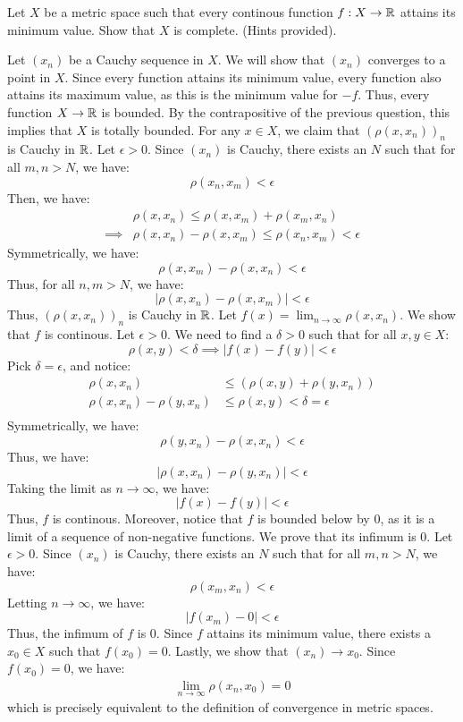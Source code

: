 \documentclass[12pt]{article}
\begin{document}
\newpage

\begin{problab}{7}
    Let $X$ be a metric space such that every continous function $f: X \to \mathbb R$ attains its minimum value. Show that $X$ is complete. (Hints provided).
\end{problab}

\begin{solu}
    Let $(x_n)$ be a Cauchy sequence in $X$. We will show that $(x_n)$ converges to a point in $X$. \bbni
    Since every function attains its minimum value, every function also attains its maximum value, as this is the minimum value for $-f$. Thus, every function $X \to \mathbb R$ is bounded. By the contrapositive of the previous question, this implies that $X$ is totally bounded. \bbni
    For any $x \in X$, we claim that $(\rho(x, x_n))_n$ is Cauchy in $\mathbb R$. Let $\epsilon > 0$. Since $(x_n)$ is Cauchy, there exists an $N$ such that for all $m, n > N$, we have: 
    \[ \rho(x_n, x_m) < \epsilon\]
    Then, we have:
    \begin{align*}
       &\rho(x, x_n) \leq \rho(x, x_m) + \rho(x_m, x_n) \\
       \implies &\rho(x, x_n) - \rho(x, x_m) \leq \rho(x_n, x_m) < \epsilon
    \end{align*}
    Symmetrically, we have:
    \[\rho(x, x_m) - \rho(x, x_n) < \epsilon\]
    Thus, for all $n, m > N$, we have:
    \[|\rho(x, x_n) - \rho(x, x_m)| < \epsilon \]
    Thus, $(\rho(x, x_n))_n$ is Cauchy in $\mathbb R$. \bbni 
    Let $f(x) = \lim_{n \to \infty} \rho(x, x_n)$. We show that $f$ is continous. Let $\epsilon > 0$. We need to find a $\delta > 0$ such that for all $x, y \in X$: 
    \[\rho(x, y) < \delta \implies |f(x) - f(y)| < \epsilon \]
    Pick $\delta = \epsilon$, and notice:
    \begin{align*}
        \rho(x, x_n) &\leq (\rho(x, y) + \rho(y, x_n) ) \\ 
        \rho(x, x_n) - \rho(y, x_n) &\leq \rho(x, y) < \delta = \epsilon \\
    \end{align*}
    Symmetrically, we have:
    \[\rho(y, x_n) - \rho(x, x_n) < \epsilon \]
    Thus, we have:
    \[ |\rho(x, x_n) - \rho(y, x_n)| < \epsilon\]
    Taking the limit as $n \to \infty$, we have:
    \[|f(x) - f(y) | < \epsilon\]
    Thus, $f$ is continous. \bbni
    Moreover, notice that $f$ is bounded below by $0$, as it is a limit of a sequence of non-negative functions. We prove that its infimum is $0$. Let $\epsilon > 0$. Since $(x_n)$ is Cauchy, there exists an $N$ such that for all $m, n > N$, we have: 
    \[\rho(x_m, x_n) < \epsilon\]
    Letting $n \to \infty$, we have:
    \[|f(x_m) - 0| < \epsilon \]
    Thus, the infimum of $f$ is $0$. Since $f$ attains its minimum value, there exists a $x_0 \in X$ such that $f(x_0) = 0$. \bbni 
    Lastly, we show that $(x_n) \to x_0$. Since $f(x_0) = 0$, we have:
    \begin{align*}
        \lim_{n\to \infty} \rho(x_n, x_0) = 0
    \end{align*}
    which is precisely equivalent to the definition of convergence in metric spaces.
\end{solu}
\newpage
\end{document}
